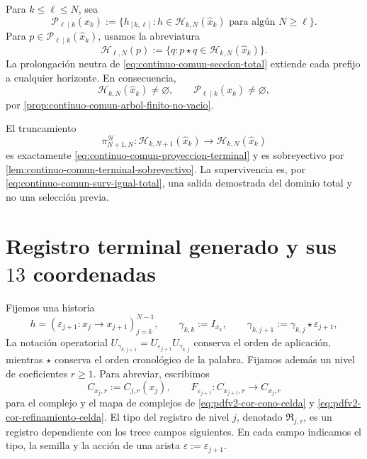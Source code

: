 Para \(k\leq\ell\leq N\), sea
\begin{equation}
\label{eq:pdfv2-terminal-prefijos-intermedios}
 \mathscr P_{\ell\mid k}(\widehat x_k)
 :=\{h_{[k,\ell]}:h\in\mathscr H_{k,N}(\widehat x_k)
       \text{ para alg\'un }N\geq\ell\}.
\end{equation}
Para \(p\in\mathscr P_{\ell\mid k}(\widehat x_k)\), usamos la abreviatura
\begin{equation}
\label{eq:pdfv2-terminal-continuaciones-prefijo}
 \mathscr H_{\ell,N}(p)
 :=\{q:p\star q\in\mathscr H_{k,N}(\widehat x_k)\}.
\end{equation}
La prolongaci\'on neutra de \eqref{eq:continuo-comun-seccion-total} extiende
cada prefijo a cualquier horizonte. En consecuencia,
\begin{equation}
\label{eq:pdfv2-terminal-no-vacuidad-historias}
 \mathscr H_{k,N}(\widehat x_k)\neq\varnothing,
 \qquad
 \mathscr P_{\ell\mid k}(\widehat x_k)\neq\varnothing,
\end{equation}
por \cref{prop:continuo-comun-arbol-finito-no-vacio}.

El truncamiento
\begin{equation}
\label{eq:pdfv2-terminal-truncamiento-historias}
 \pi_{N+1,N}^{\mathscr H}:
 \mathscr H_{k,N+1}(\widehat x_k)
 \longrightarrow\mathscr H_{k,N}(\widehat x_k)
\end{equation}
es exactamente \eqref{eq:continuo-comun-proyeccion-terminal} y es
sobreyectivo por \cref{lem:continuo-comun-terminal-sobreyectivo}. La
supervivencia es, por
\eqref{eq:continuo-comun-surv-igual-total}, una salida demostrada del dominio
total y no una selecci\'on previa.

\section{Registro terminal generado y sus \(13\) coordenadas}

Fijemos una historia
\[
 h=(\varepsilon_{j+1}:x_j\longrightarrow x_{j+1})_{j=k}^{N-1},
 \qquad
 \gamma_{k,k}:=I_{x_k},\qquad
 \gamma_{k,j+1}:=\gamma_{k,j}\star\varepsilon_{j+1},
\]
La notación operatorial
\(U_{\gamma_{k,j+1}}
=U_{\varepsilon_{j+1}}U_{\gamma_{k,j}}\) conserva el orden de aplicación,
mientras \(\star\) conserva el orden cronológico de la palabra. Fijamos
además un nivel de coeficientes \(r\geq1\). Para abreviar, escribimos
\[
 C_{x_j,r}:=C_{j,r}(x_j),\qquad
 F_{\varepsilon_{j+1}}:C_{x_{j+1},r}\longrightarrow C_{x_j,r}
\]
para el complejo y el mapa de complejos de
\eqref{eq:pdfv2-cor-cono-celda} y
\eqref{eq:pdfv2-cor-refinamiento-celda}. El tipo del registro de nivel
\(j\), denotado \(\mathfrak R_{j,r}\), es un registro dependiente con los
trece campos siguientes. En cada campo indicamos el tipo, la semilla y la
acción de una arista \(\varepsilon:=\varepsilon_{j+1}\).

